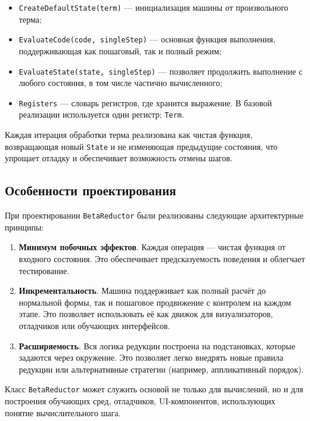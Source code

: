 \begin{itemize}
  \item \texttt{CreateDefaultState(term)} — инициализация машины от произвольного терма;
  \item \texttt{EvaluateCode(code, singleStep)} — основная функция выполнения, поддерживающая как пошаговый, так и полный режим;
  \item \texttt{EvaluateState(state, singleStep)} — позволяет продолжить выполнение с любого состояния, в том числе частично вычисленного;
  \item \texttt{Registers} — словарь регистров, где хранится выражение. В базовой реализации используется один регистр: \texttt{Term}.
\end{itemize}

Каждая итерация обработки терма реализована как чистая функция, возвращающая новый \texttt{State} и не изменяющая предыдущие состояния, что упрощает отладку и обеспечивает возможность отмены шагов.

\subsection{Особенности проектирования}

При проектировании \texttt{BetaReductor} были реализованы следующие архитектурные принципы:

\begin{enumerate}
  \item \textbf{Минимум побочных эффектов}. Каждая операция — чистая функция от входного состояния. Это обеспечивает предсказуемость поведения и облегчает тестирование.
  \item \textbf{Инкрементальность}. Машина поддерживает как полный расчёт до нормальной формы, так и пошаговое продвижение с контролем на каждом этапе. Это позволяет использовать её как движок для визуализаторов, отладчиков или обучающих интерфейсов.
  \item \textbf{Расширяемость}. Вся логика редукции построена на подстановках, которые задаются через окружение. Это позволяет легко внедрять новые правила редукции или альтернативные стратегии (например, аппликативный порядок).
\end{enumerate}


Класс \texttt{BetaReductor} может служить основой не только для вычислений, но и для построения обучающих сред, отладчиков, UI-компонентов, использующих понятие вычислительного шага.


